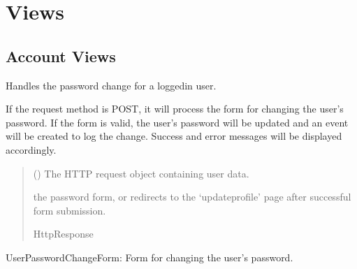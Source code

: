 \documentclass[letterpaper,10pt,english]{sphinxmanual}
\begin{document}
\sphinxstepscope


\chapter{Views}
\label{\detokenize{modules/views:views}}\label{\detokenize{modules/views::doc}}

\section{Account Views}
\label{\detokenize{modules/views:module-account.views}}\label{\detokenize{modules/views:account-views}}

\begin{fulllineitems}
\label{\detokenize{modules/views:account.views.change_password}}
\pysigstartsignatures
{}
\pysigstopsignatures
\sphinxAtStartPar
Handles the password change for a logged\sphinxhyphen{}in user.

\sphinxAtStartPar
If the request method is POST, it will process the form for changing the
user’s password. If the form is valid, the user’s password will be updated
and an event will be created to log the change. Success and error messages
will be displayed accordingly.
\begin{quote}\begin{description}
\sphinxAtStartPar
{} () \textendash{} The HTTP request object containing user data.

\sphinxAtStartPar
\begin{description}
\sphinxAtStartPar
the password form, or redirects to the ‘update\sphinxhyphen{}profile’
page after successful form submission.

\end{description}


\sphinxAtStartPar
HttpResponse

\end{description}\end{quote}
\begin{description}
\sphinxAtStartPar
UserPasswordChangeForm: Form for changing the user’s password.

\end{description}

\end{fulllineitems}
\end{document}
